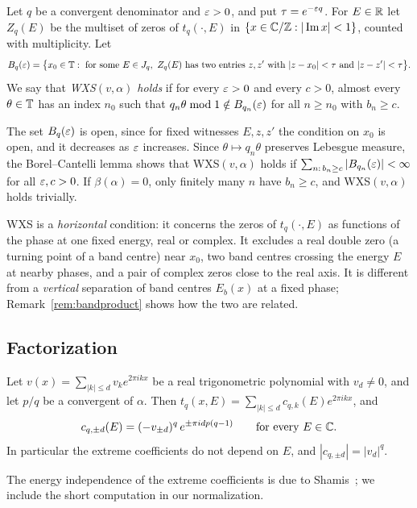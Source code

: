 \begin{definition}\label{def:WXS}
Let $q$ be a convergent denominator and $\varepsilon>0$, and put $\tau=e^{-\varepsilon q}$. For $E\in\mathbb R$ let $Z_q(E)$ be the multiset of zeros of $t_q(\cdot,E)$ in $\{x\in\mathbb C/\mathbb Z:|\operatorname{Im}x|<1\}$, counted with multiplicity. Let
\[
B_q(\varepsilon)=\bigl\{x_0\in\mathbb T:\ \text{for some }E\in J_q,\ Z_q(E)\text{ has two entries }z,z'\text{ with }|z-x_0|<\tau\text{ and }|z-z'|<\tau\bigr\}.
\]
We say that \emph{WXS$(v,\alpha)$ holds} if for every $\varepsilon>0$ and every $c>0$, almost every $\theta\in\mathbb T$ has an index $n_0$ such that $q_n\theta\bmod1\notin B_{q_n}(\varepsilon)$ for all $n\ge n_0$ with $b_n\ge c$.
\end{definition}

The set $B_q(\varepsilon)$ is open, since for fixed witnesses $E,z,z'$ the condition on $x_0$ is open, and it decreases as $\varepsilon$ increases. Since $\theta\mapsto q_n\theta$ preserves Lebesgue measure, the Borel--Cantelli lemma shows that WXS$(v,\alpha)$ holds if $\sum_{n:\,b_n\ge c}|B_{q_n}(\varepsilon)|<\infty$ for all $\varepsilon,c>0$. If $\beta(\alpha)=0$, only finitely many $n$ have $b_n\ge c$, and WXS$(v,\alpha)$ holds trivially.

WXS is a \emph{horizontal} condition: it concerns the zeros of $t_q(\cdot,E)$ as functions of the phase at one fixed energy, real or complex. It excludes a real double zero (a turning point of a band centre) near $x_0$, two band centres crossing the energy $E$ at nearby phases, and a pair of complex zeros close to the real axis. It is different from a \emph{vertical} separation of band centres $E_b(x)$ at a fixed phase; Remark~\ref{rem:bandproduct} shows how the two are related.

\subsection{Factorization}\label{sec:EF}

\begin{lemma}\label{lem:trigpot}
Let $v(x)=\sum_{|k|\le d}v_ke^{2\pi ikx}$ be a real trigonometric polynomial with $v_d\ne0$, and let $p/q$ be a convergent of $\alpha$. Then $t_q(x,E)=\sum_{|k|\le d}c_{q,k}(E)e^{2\pi ikx}$, and
\[
c_{q,\pm d}(E)=(-v_{\pm d})^q\,e^{\pm\pi idp(q-1)}\qquad\text{for every }E\in\mathbb C .
\]
In particular the extreme coefficients do not depend on $E$, and $|c_{q,\pm d}|=|v_d|^q$.
\end{lemma}

The energy independence of the extreme coefficients is due to Shamis~\cite[Propositions~3.1 and~3.2]{Shamis2011}; we include the short computation in our normalization.

